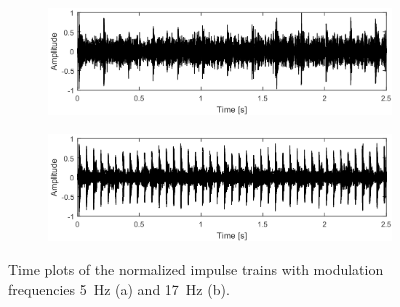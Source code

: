 \begin{figure}[!ht]
    \centering
    \begin{subfigure}[b]{0.9\textwidth}
        \centering
        \captionsetup{skip=0.01pt}
         \caption{}
        \includegraphics[width=\textwidth]{wykresy/chapter_application/semi_blind/sygnal_ff5_simulated.png}
    \end{subfigure}
    \begin{subfigure}[b]{0.9\textwidth}
        \centering
        \captionsetup{skip=0.01pt}
         \caption{}
        \includegraphics[width=\textwidth]{wykresy/chapter_application/semi_blind/sygnal_ff17_simulated.png}
    \end{subfigure}
    \caption{Time plots of the normalized impulse trains with modulation frequencies 5~Hz (a) and 17~Hz (b).}
    \label{fig:chapter7/semi_blind/sim_skladowe}
\end{figure}
%
